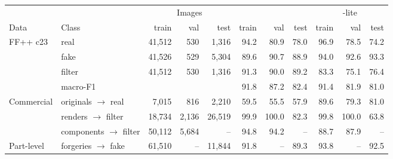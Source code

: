 \begin{tabular}{@{}llrrr|rrr|rrr@{}}
\toprule
 & & \multicolumn{3}{c|}{Images} & \multicolumn{3}{c|}{\ours{}} & \multicolumn{3}{c}{\ours{}-lite} \\
Data & Class & train & val & test & train & val & test & train & val & test \\
\midrule
FF++ c23 & real & 41,512 & 530 & 1,316 & 94.2 & 80.9 & 78.0 & 96.9 & 78.5 & 74.2 \\
 & fake & 41,526 & 529 & 5,304 & 89.6 & 90.7 & 88.9 & 94.0 & 92.6 & 93.3 \\
 & filter & 41,512 & 530 & 1,316 & 91.3 & 90.0 & 89.2 & 83.3 & 75.1 & 76.4 \\
 & macro-F1 &  &  &  & 91.8 & 87.2 & 82.4 & 91.4 & 81.9 & 81.0 \\
\midrule
Commercial & originals $\to$ real & 7,015 & 816 & 2,210 & 59.5 & 55.5 & 57.9 & 89.6 & 79.3 & 81.0 \\
 & renders $\to$ filter & 18,734 & 2,136 & 26,519 & 99.9 & 100.0 & 82.3 & 99.8 & 100.0 & 63.8 \\
 & components $\to$ filter & 50,112 & 5,684 & -- & 94.8 & 94.2 & -- & 88.7 & 87.9 & -- \\
\midrule
Part-level & forgeries $\to$ fake & 61,510 & -- & 11,844 & 91.8 & -- & 89.3 & 93.8 & -- & 92.5 \\
\bottomrule
\end{tabular}
